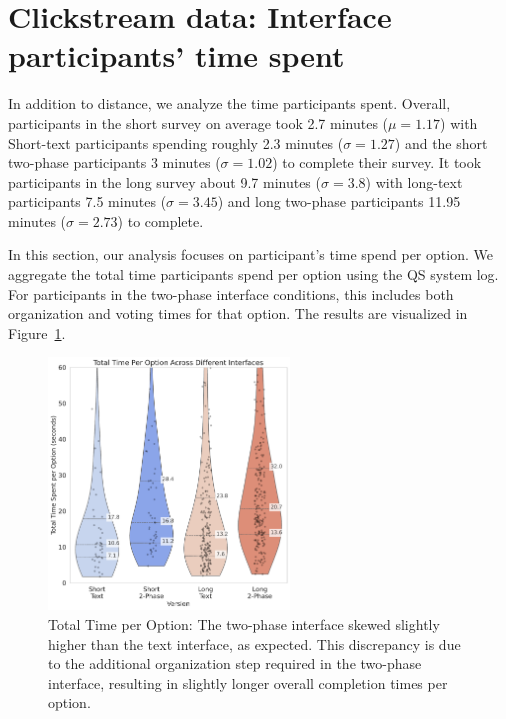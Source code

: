 \section{Clickstream data: Interface participants' time spent}
In addition to distance, we analyze the time participants spent. Overall, participants in the short survey on average took 2.7 minutes ($\mu=1.17$) with Short-text participants spending roughly 2.3 minutes ($\sigma=1.27$) and the short two-phase participants 3 minutes ($\sigma=1.02$) to complete their survey. It took participants in the long survey about 9.7 minutes ($\sigma=3.8$) with long-text participants 7.5 minutes ($\sigma=3.45$) and long two-phase participants 11.95 minutes ($\sigma=2.73$) to complete.

In this section, our analysis focuses on participant's time spend per option. We aggregate the total time participants spend per option using the QS system log. For participants in the two-phase interface conditions, this includes both organization and voting times for that option. The results are visualized in Figure~\ref{fig:total_time}.

\begin{figure}[h]
    \centering
    \includegraphics[width=0.57\textwidth, trim=0 0 0 0, clip]{content/image/time/Total Time Per Option Across Different Interfaces.pdf}
    \captionsetup{width=0.7\textwidth, justification=justified}
    \caption{Total Time per Option: The two-phase interface skewed slightly higher than the text interface, as expected. This discrepancy is due to the additional organization step required in the two-phase interface, resulting in slightly longer overall completion times per option.}
    \label{fig:total_time}
\end{figure}

